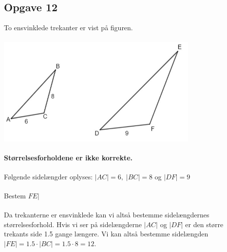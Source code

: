 \subsection{Opgave 12}
To ensvinklede trekanter er vist på figuren.\\\\
\includegraphics[width=10cm]{Opgave_11-20/Opgave_12/Opgave_12.jpg}\\\\
\textbf{Størrelsesforholdene er ikke korrekte.}\\\\

Følgende sidelængder oplyses: $|AC| = 6,\; |BC| = 8$ og $|DF| = 9$\\\\

Bestem $FE|$\\\\

\ans
Da trekanterne er ensvinklede kan vi altså bestemme sidelængdernes størrelsesforhold. Hvis vi ser på sidelængderne $|AC|$ og $|DF|$ er den større trekants side 1.5 gange længere. Vi kan altså bestemme sidelængden $|FE| = 1.5\cdot |BC| = 1.5\cdot 8 = 12$. 